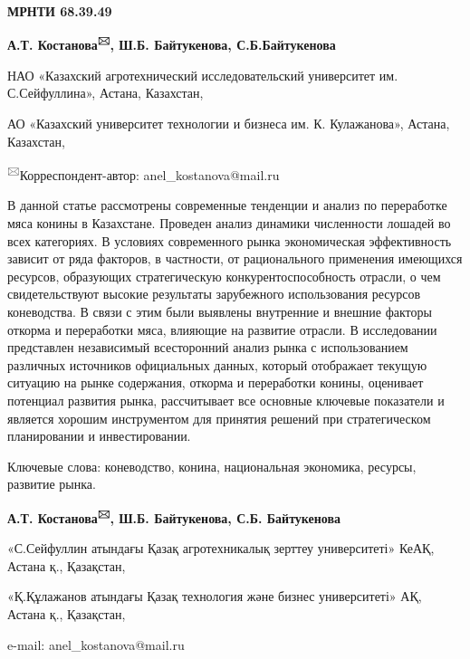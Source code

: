 



\newpage
{\bfseries МРНТИ 68.39.49}


\begin{center}

{\bfseries А.Т. Костанова\textsuperscript{🖂}, Ш.Б. Байтукенова, С.Б.Байтукенова}

НАО «Казахский агротехнический исследовательский университет им.
С.Сейфуллина», Астана, Казахстан,

АО «Казахский университет технологии и бизнеса им. К. Кулажанова», Астана, Казахстан,
\end{center}

\textsuperscript{🖂}Корреспондент-автор: anel\_kostanova@mail.ru

В данной статье рассмотрены современные тенденции и анализ по
переработке мяса конины в Казахстане. Проведен анализ динамики
численности лошадей во всех категориях. В условиях современного рынка
экономическая эффективность зависит от ряда факторов, в частности, от
рационального применения имеющихся ресурсов, образующих стратегическую
конкурентоспособность отрасли, о чем свидетельствуют высокие результаты
зарубежного использования ресурсов коневодства. В связи с этим были
выявлены внутренние и внешние факторы откорма и переработки мяса,
влияющие на развитие отрасли. В исследовании представлен независимый
всесторонний анализ рынка с использованием различных источников
официальных данных, который отображает текущую ситуацию на рынке
содержания, откорма и переработки конины, оценивает потенциал развития
рынка, рассчитывает все основные ключевые показатели и является хорошим
инструментом для принятия решений при стратегическом планировании и
инвестировании.

Ключевые слова: коневодство, конина, национальная экономика, ресурсы,
развитие рынка.

\begin{center}

{\bfseries А.Т. Костанова\textsuperscript{🖂}, Ш.Б. Байтукенова, С.Б.
Байтукенова}

«С.Сейфуллин атындағы Қазақ агротехникалық зерттеу университеті» КеАҚ, Астана қ., Қазақстан,

«Қ.Құлажанов атындағы Қазақ технология және бизнес университеті» АҚ, Астана қ., Қазақстан,

e-mail: anel\_kostanova@mail.ru
\end{center}

